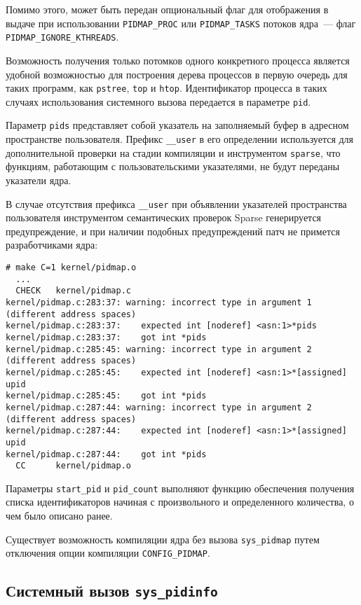 Помимо этого, может быть передан опциональный флаг для отображения в выдаче
при использовании \texttt{PIDMAP\_PROC} или \texttt{PIDMAP\_TASKS} потоков
ядра~--- флаг \texttt{PIDMAP\_IGNORE\_KTHREADS}.

Возможность получения только потомков одного конкретного процесса является
удобной возможностью для построения дерева процессов в первую очередь для таких
программ, как \texttt{pstree}, \texttt{top} и \texttt{htop}. Идентификатор
процесса в таких случаях использования системного вызова передается в параметре
\texttt{pid}.

Параметр \texttt{pids} представляет собой указатель на заполняемый буфер в
адресном пространстве пользователя. Префикс \texttt{\_\_user} в его определении
используется для дополнительной проверки на стадии компиляции и инструментом
\texttt{sparse}, что функциям, работающим с пользовательскими указателями, не
будут переданы указатели ядра.

В случае отсутствия префикса \texttt{\_\_user} при объявлении указателей
пространства пользователя инструментом семантических проверок Sparse
генерируется предупреждение, и при наличии подобных предупреждений патч не
примется разработчиками ядра:

\medskip
\begin{lstlisting}[style=cstyle]
# make C=1 kernel/pidmap.o
  ...
  CHECK   kernel/pidmap.c
kernel/pidmap.c:283:37: warning: incorrect type in argument 1 (different address spaces)
kernel/pidmap.c:283:37:    expected int [noderef] <asn:1>*pids
kernel/pidmap.c:283:37:    got int *pids
kernel/pidmap.c:285:45: warning: incorrect type in argument 2 (different address spaces)
kernel/pidmap.c:285:45:    expected int [noderef] <asn:1>*[assigned] upid
kernel/pidmap.c:285:45:    got int *pids
kernel/pidmap.c:287:44: warning: incorrect type in argument 2 (different address spaces)
kernel/pidmap.c:287:44:    expected int [noderef] <asn:1>*[assigned] upid
kernel/pidmap.c:287:44:    got int *pids
  CC      kernel/pidmap.o
\end{lstlisting}
\medskip

Параметры \texttt{start\_pid} и \texttt{pid\_count} выполняют функцию обеспечения
получения списка идентификаторов начиная с произвольного и определенного
количества, о чем было описано ранее.

Существует возможность компиляции ядра без вызова \texttt{sys\_pidmap} путем
отключения опции компиляции \texttt{CONFIG\_PIDMAP}.

\subsection{Системный вызов \texttt{sys\_pidinfo}}

